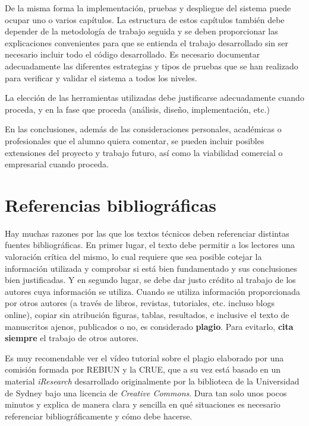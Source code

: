 \documentclass[pdftex,11pt,a4paper]{book}
\begin{document}
De la misma forma la implementación, pruebas y despliegue del sistema puede ocupar uno o varios capítulos. La estructura de estos capítulos también debe depender de la metodología de trabajo seguida y se deben proporcionar las explicaciones convenientes para que se entienda el trabajo desarrollado sin ser necesario incluir todo el código desarrollado. Es necesario documentar adecuadamente las diferentes estrategias y tipos de pruebas que se han realizado para verificar y validar el sistema a todos los niveles.

La elección de las herramientas utilizadas debe justificarse adecuadamente cuando proceda, y en la fase que proceda (análisis, diseño, implementación, etc.)

En las conclusiones, además de las consideraciones personales, académicas o profesionales que el alumno quiera comentar, 
se pueden incluir posibles extensiones del proyecto y trabajo futuro, así como la viabilidad comercial o empresarial cuando proceda.

\section*{Referencias bibliográficas}

Hay muchas razones por las que los textos técnicos deben referenciar distintas fuentes bibliográficas. En primer lugar, el texto debe permitir a los lectores una valoración crítica del mismo, lo cual requiere que sea posible cotejar la información utilizada y comprobar si está bien fundamentado y sus conclusiones bien justificadas. Y en segundo lugar, se debe dar justo crédito al trabajo de los autores cuya información se utiliza. Cuando se utiliza información proporcionada por otros autores 
(a través de libros, revistas, tutoriales, etc. incluso blogs online), copiar sin atribución figuras, tablas, resultados, e inclusive el texto de manuscritos ajenos, publicados o no, es considerado \textbf{plagio}. Para evitarlo, \textbf{cita siempre} el trabajo de otros autores. 

Es muy recomendable ver el vídeo tutorial sobre el plagio \cite{bib:plagio} elaborado por una comisión formada por REBIUN y la CRUE, que a su vez está basado en un material \textit{iResearch} desarrollado originalmente por la biblioteca de la Universidad de Sydney bajo una licencia de \textit{Creative Commons}. Dura tan solo unos pocos minutos y explica de manera clara y sencilla en qué situaciones es necesario referenciar bibliográficamente y cómo debe hacerse.
\end{document}

